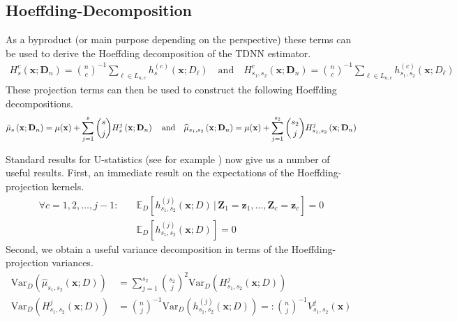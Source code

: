 \documentclass[letterpaper,10pt]{article}
\numberwithin{equation}{section}
\numberwithin{thm}{section}
\numberwithin{lem}{section}
\numberwithin{cor}{section}
\renewcommand{\hat}{\widehat}
\newcommand{\E}{\mathbb{E}}
\newcommand{\1}{\mathbbm{1}}
\newcommand{\Var}{\text{Var}}
\begin{document}
\subsection{Hoeffding-Decomposition}
As a byproduct (or main purpose depending on the perspective) these terms can be used to derive the Hoeffding decomposition of the TDNN estimator.
\begin{equation}\label{eq:H_projection}
	\begin{aligned}
		H_{s}^{c}\left(\mathbf{x}; \mathbf{D}_n\right)
		= \binom{n}{c}^{-1} \sum_{\ell \in L_{n,c}} h^{(c)}_{s}(\mathbf{x}; D_{\ell})
		\quad \text{and} \quad
		H_{s_1, s_2}^{c}\left(\mathbf{x}; \mathbf{D}_n\right)
		= \binom{n}{c}^{-1} \sum_{\ell \in L_{n,c}} h^{(c)}_{s_1, s_2}(\mathbf{x}; D_{\ell})
	\end{aligned}
\end{equation}
These projection terms can then be used to construct the following Hoeffding decompositions.
\begin{equation}\label{eq:H_Decomp}
	\tilde{\mu}_{s}\left(\mathbf{x}; \mathbf{D}_n\right)
	= \mu(\mathbf{x}) + \sum_{j = 1}^{s}\binom{s}{j}H_{s}^{j}\left(\mathbf{x}; \mathbf{D}_n\right)\\
	\quad \text{and} \quad
	\hat{\mu}_{s_1, s_2}\left(\mathbf{x}; \mathbf{D}_n\right)
	= \mu(\mathbf{x}) + \sum_{j = 1}^{s_2}\binom{s_2}{j}H_{s_1, s_2}^{j}\left(\mathbf{x}; \mathbf{D}_n\right)
\end{equation}

Standard results for U-statistics (see for example \citet{lee_u-statistics_2019}) now give us a number of useful results.
First, an immediate result on the expectations of the Hoeffding-projection kernels.
\begin{align}\label{eq:H_k_expectation}
	\forall c = 1,2,\dotsc, j-1: \quad & \E_{D}\left[h_{s_1, s_2}^{(j)}\left(\mathbf{x}; D\right) \, | \, \mathbf{Z}_1 = \mathbf{z}_1, \dotsc, \mathbf{Z}_c = \mathbf{z}_c\right] = 0\\
	& \E_{D}\left[h_{s_1, s_2}^{(j)}\left(\mathbf{x}; D\right)\right] = 0
\end{align}
Second, we obtain a useful variance decomposition in terms of the Hoeffding-projection variances.
\begin{align}\label{eq:Var_decomp}
		\Var_{D}\left(\hat{\mu}_{s_1, s_2}\left(\mathbf{x}; D\right)\right) 
	& = \sum_{j = 1}^{s_2} \binom{s_2}{j}^2 \Var_{D}\left(H_{s_1, s_2}^{j}\left(\mathbf{x}; D\right)\right)\\
	\Var_{D}\left(H_{s_1, s_2}^{j}\left(\mathbf{x}; D\right)\right)
	& = \binom{n}{j}^{-1} \Var_{D}\left(h_{s_1, s_2}^{(j)}\left(\mathbf{x}; D\right)\right)
	=: \binom{n}{j}^{-1} V_{s_1, s_2}^{j}\left(\mathbf{x}\right)
\end{align}
\end{document}
